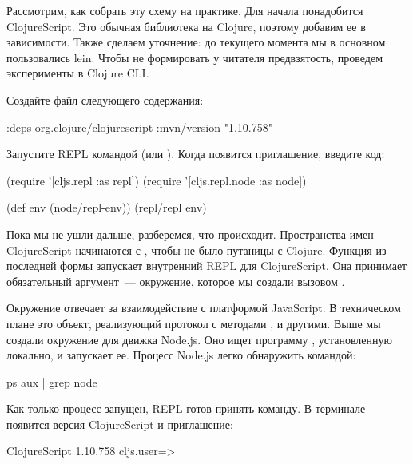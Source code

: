 Рассмотрим, как собрать эту схему на практике. Для начала понадобится ClojureScript. Это обычная библиотека на Clojure, поэтому добавим ее в зависимости. Также сделаем уточнение: до текущего момента мы в основном пользовались lein. Чтобы не формировать у читателя предвзятость, проведем эксперименты в Clojure CLI.

Создайте файл  следующего содержания:

\begin{english}
  \begin{clojure}
{:deps
 {org.clojure/clojurescript {:mvn/version "1.10.758"}}}
  \end{clojure}
\end{english}

Запустите REPL командой  (или ). Когда появится приглашение, введите код:

\begin{english}
  \begin{clojure}
(require '[cljs.repl :as repl])
(require '[cljs.repl.node :as node])

(def env (node/repl-env))
(repl/repl env)
  \end{clojure}
\end{english}

Пока мы не ушли дальше, разберемся, что происходит. Пространства имен ClojureScript начинаются с , чтобы не было путаницы с Clojure. Функция  из последней формы запускает внутренний REPL для ClojureScript. Она принимает обязательный аргумент~--- окружение, которое мы создали вызовом .

Окружение отвечает за взаимодействие с платформой JavaScript. В техническом плане это объект, реализующий протокол  с методами ,  и другими. Выше мы создали окружение для движка Node.js. Оно ищет программу , установленную локально, и запускает ее. Процесс Node.js легко обнаружить командой:

\begin{english}
  \begin{bash}
ps aux | grep node
  \end{bash}
\end{english}

Как только процесс запущен, REPL готов принять команду. В терминале появится версия ClojureScript и приглашение:

\begin{english}
  \begin{text}
ClojureScript 1.10.758
cljs.user=>
  \end{text}
\end{english}

